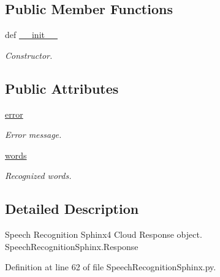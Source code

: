 \subsection*{Public Member Functions}
\begin{DoxyCompactItemize}
\item 
def \hyperlink{classRappCloud_1_1CloudMsgs_1_1SpeechRecognitionSphinx_1_1SpeechRecognitionSphinx_1_1Response_a498647de48bc0cce2eefdb94a65ec124}{\-\_\-\-\_\-init\-\_\-\-\_\-}
\begin{DoxyCompactList}\small\item\em Constructor. \end{DoxyCompactList}\end{DoxyCompactItemize}
\subsection*{Public Attributes}
\begin{DoxyCompactItemize}
\item 
\hyperlink{classRappCloud_1_1CloudMsgs_1_1SpeechRecognitionSphinx_1_1SpeechRecognitionSphinx_1_1Response_aa18fa78d6b9c73f81f6dc02203306f38}{error}
\begin{DoxyCompactList}\small\item\em Error message. \end{DoxyCompactList}\item 
\hyperlink{classRappCloud_1_1CloudMsgs_1_1SpeechRecognitionSphinx_1_1SpeechRecognitionSphinx_1_1Response_a8e6302ec83a5505353ac031237ddfb7a}{words}
\begin{DoxyCompactList}\small\item\em Recognized words. \end{DoxyCompactList}\end{DoxyCompactItemize}


\subsection{Detailed Description}
\begin{DoxyVerb}Speech Recognition Sphinx4 Cloud Response object.
SpeechRecognitionSphinx.Response
\end{DoxyVerb}
 

Definition at line 62 of file Speech\-Recognition\-Sphinx.\-py.



